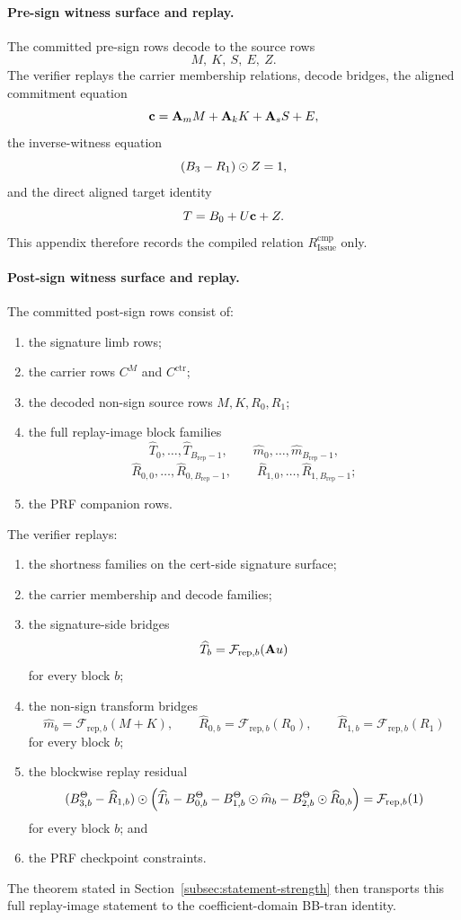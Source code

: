 \paragraph{Pre-sign witness surface and replay.}
The committed pre-sign rows decode to the source rows
\[
M,\ K,\ S,\ E,\ Z.
\]
The verifier replays the carrier membership relations, decode bridges, the aligned commitment equation
\[
\mathbf{c} = \mathbf{A}_m M + \mathbf{A}_k K + \mathbf{A}_s S + E,
\]
the inverse-witness equation
\[
(B_3-R_1)\odot Z = 1,
\]
and the direct aligned target identity
\[
T = B_0 + U\mathbf{c} + Z.
\]
This appendix therefore records the compiled relation \(R_{\mathrm{Issue}}^{\mathrm{cmp}}\) only.

\paragraph{Post-sign witness surface and replay.}
The committed post-sign rows consist of:
\begin{enumerate}[leftmargin=1.25em]
    \item the signature limb rows;
    \item the carrier rows \(C^M\) and \(C^{\mathrm{ctr}}\);
    \item the decoded non-sign source rows \(M,K,R_0,R_1\);
    \item the full replay-image block families
    \[
    \widehat T_0,\ldots,\widehat T_{B_{\mathrm{rep}}-1},\qquad
    \widehat m_0,\ldots,\widehat m_{B_{\mathrm{rep}}-1},
    \]
    \[
    \widehat R_{0,0},\ldots,\widehat R_{0,B_{\mathrm{rep}}-1},\qquad
    \widehat R_{1,0},\ldots,\widehat R_{1,B_{\mathrm{rep}}-1};
    \]
    \item the PRF companion rows.
\end{enumerate}
The verifier replays:
\begin{enumerate}[leftmargin=1.25em]
    \item the shortness families on the cert-side signature surface;
    \item the carrier membership and decode families;
    \item the signature-side bridges
    \[
    \widehat T_b = \mathcal F_{\mathrm{rep},b}(\mathbf{A} u)
    \]
    for every block \(b\);
    \item the non-sign transform bridges
    \[
    \widehat m_b = \mathcal F_{\mathrm{rep},b}(M+K),\qquad
    \widehat R_{0,b} = \mathcal F_{\mathrm{rep},b}(R_0),\qquad
    \widehat R_{1,b} = \mathcal F_{\mathrm{rep},b}(R_1)
    \]
    for every block \(b\);
    \item the blockwise replay residual
    \[
    (B_{3,b}^\Theta-\widehat R_{1,b})\odot\Bigl(\widehat T_b-B_{0,b}^\Theta-B_{1,b}^\Theta\odot \widehat m_b-B_{2,b}^\Theta\odot \widehat R_{0,b}\Bigr)
    = \mathcal F_{\mathrm{rep},b}(1)
    \]
    for every block \(b\); and
    \item the PRF checkpoint constraints.
\end{enumerate}
The theorem stated in Section~\ref{subsec:statement-strength} then transports
this full replay-image statement to the coefficient-domain BB-tran identity.

